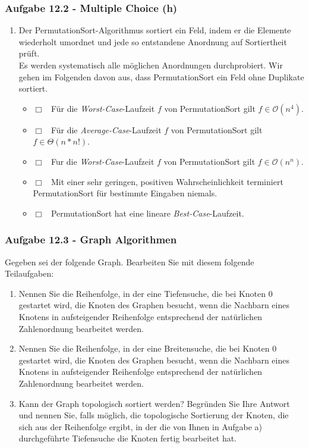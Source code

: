 \documentclass{beamer}
\begin{document}
\begin{frame}[t]
	\frametitle{Aufgabe 12.2 - Multiple Choice (h)}
	\small
	\begin{enumerate}[label=\textcolor{black}{\alph*)},align=left,leftmargin=*,itemsep=1em,start=8]
		\item Der PermutationSort-Algorithmus sortiert ein Feld, indem er die Elemente wiederholt
		      umordnet und jede so entstandene Anordnung auf Sortiertheit prüft. \\
		      Es werden systematisch alle möglichen Anordnungen durchprobiert. Wir gehen im Folgenden davon
		      aus, dass PermutationSort ein Feld ohne Duplikate sortiert.
		      \begin{itemize}[label={},itemsep=3pt,align=left,leftmargin=*]
			      \item $\Box$ \, Für die \textit{Worst-Case}-Laufzeit $f$ von PermutationSort gilt $f \in \mathcal{O}(n^4)$.
			      \item $\Box$ \, Für die \textit{Average-Case}-Laufzeit $f$ von PermutationSort gilt $f \in \Theta(n \ast n!)$.
			      \item $\Box$ \, Fur die \textit{Worst-Case}-Laufzeit $f$ von PermutationSort gilt $f \in \mathcal{O}(n^n)$.
			      \item $\Box$ \, Mit einer sehr geringen, positiven Wahrscheinlichkeit terminiert PermutationSort
			            für bestimmte Eingaben niemals.
			      \item $\Box$ \, PermutationSort hat eine lineare \textit{Best-Case}-Laufzeit.
		      \end{itemize}
	\end{enumerate}
\end{frame}

\begin{frame}
	\frametitle{Aufgabe 12.3 - Graph Algorithmen}
	\small
	Gegeben sei der folgende Graph. Bearbeiten Sie mit diesem folgende Teilaufgaben:
	\begin{enumerate}[label=\textcolor{black}{\alph*)},align=left,leftmargin=*,itemsep=0.75em]
		\item Nennen Sie die Reihenfolge, in der eine Tiefensuche, die bei Knoten $0$ gestartet wird,
		      die Knoten des Graphen besucht, wenn die Nachbarn eines Knotens in aufsteigender
		      Reihenfolge entsprechend der natürlichen Zahlenordnung bearbeitet werden.
		\item Nennen Sie die Reihenfolge, in der eine Breitensuche, die bei Knoten $0$ gestartet wird,
		      die Knoten des Graphen besucht, wenn die Nachbarn eines Knotens in aufsteigender
		      Reihenfolge entsprechend der natürlichen Zahlenordnung bearbeitet werden.
		\item Kann der Graph topologisch sortiert werden? Begründen Sie Ihre Antwort und nennen
		      Sie, falls möglich, die topologische Sortierung der Knoten, die sich aus der Reihenfolge
		      ergibt, in der die von Ihnen in Aufgabe a) durchgeführte Tiefensuche die Knoten fertig
		      bearbeitet hat.
	\end{enumerate}
\end{frame}
\end{document}
